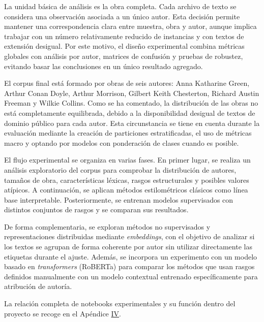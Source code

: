\documentclass[IB]{TFUOC}%
\begin{document}
La unidad básica de análisis es la obra completa. Cada archivo de texto se considera una observación asociada a un único autor. Esta decisión permite mantener una correspondencia clara entre muestra, obra y autor, aunque implica trabajar con un número relativamente reducido de instancias y con textos de extensión desigual. Por este motivo, el diseño experimental combina métricas globales con análisis por autor, matrices de confusión y pruebas de robustez, evitando basar las conclusiones en un único resultado agregado.

El corpus final está formado por obras de seis autores: Anna Katharine Green, Arthur Conan Doyle, Arthur Morrison, Gilbert Keith Chesterton, Richard Austin Freeman y Wilkie Collins. Como se ha comentado, la distribución de las obras no está completamente equilibrada, debido a la disponibilidad desigual de textos de dominio público para cada autor. Esta circunstancia se tiene en cuenta durante la evaluación mediante la creación de particiones estratificadas, el uso de métricas macro y optando por modelos con ponderación de clases cuando es posible.

El flujo experimental se organiza en varias fases. En primer lugar, se realiza un análisis exploratorio del corpus para comprobar la distribución de autores, tamaños de obra, características léxicas, rasgos estructurales y posibles valores atípicos. A continuación, se aplican métodos estilométricos clásicos como línea base interpretable. Posteriormente, se entrenan modelos supervisados con distintos conjuntos de rasgos y se comparan sus resultados.

De forma complementaria, se exploran métodos no supervisados y representaciones distribuidas mediante \textit{embeddings}, con el objetivo de analizar si los textos se agrupan de forma coherente por autor sin utilizar directamente las etiquetas durante el ajuste. Además, se incorpora un experimento con un modelo basado en \textit{transformers} (RoBERTa) para comparar los métodos que usan rasgos definidos manualmente con un modelo contextual entrenado específicamente para atribución de autoría.

La relación completa de notebooks experimentales y su función dentro del proyecto se recoge en el Apéndice \hyperref[apx:notebooks]{IV}.

\newpage
\end{document}
